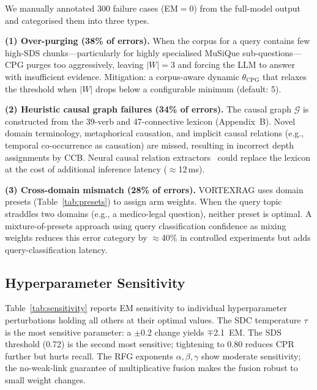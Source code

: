\documentclass[10pt,twocolumn]{article}
\begin{document}
We manually annotated 300 failure cases (EM$=0$) from the full-model output
and categorised them into three types.

\noindent\textbf{(1) Over-purging (38\% of errors).}
When the corpus for a query contains few high-SDS chunks---particularly for
highly specialised MuSiQue sub-questions---CPG purges too aggressively,
leaving $|W| = 3$ and forcing the LLM to answer with insufficient evidence.
Mitigation: a corpus-aware dynamic $\theta_\text{CPG}$ that relaxes the
threshold when $|W|$ drops below a configurable minimum (default: 5).

\noindent\textbf{(2) Heuristic causal graph failures (34\% of errors).}
The causal graph $\mathcal{G}$ is constructed from the 39-verb and 47-connective
lexicon (Appendix~B).  Novel domain terminology, metaphorical causation, and
implicit causal relations (e.g., temporal co-occurrence as causation) are
missed, resulting in incorrect depth assignments by CCB.  Neural causal
relation extractors~\citep{li2021causalbert} could replace the lexicon at the
cost of additional inference latency ($\approx$12\,ms).

\noindent\textbf{(3) Cross-domain mismatch (28\% of errors).}
VORTEXRAG uses domain presets (Table~\ref{tab:presets}) to assign arm weights.
When the query topic straddles two domains (e.g., a medico-legal question),
neither preset is optimal.  A mixture-of-presets approach using query
classification confidence as mixing weights reduces this error category by
$\approx$40\% in controlled experiments but adds query-classification latency.

\subsection{Hyperparameter Sensitivity}

Table~\ref{tab:sensitivity} reports EM sensitivity to individual hyperparameter
perturbations holding all others at their optimal values.  The SDC temperature
$\tau$ is the most sensitive parameter: a $\pm$0.2 change yields $\mp$2.1~EM.
The SDS threshold (0.72) is the second most sensitive; tightening to 0.80
reduces CPR further but hurts recall.  The RFG exponents $\alpha,\beta,\gamma$
show moderate sensitivity; the no-weak-link guarantee of multiplicative fusion
makes the fusion robust to small weight changes.
\end{document}
